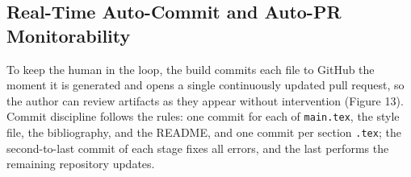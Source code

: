 \subsection{Real-Time Auto-Commit and Auto-PR Monitorability}

To keep the human in the loop, the build commits each file to GitHub the moment it
is generated and opens a single continuously updated pull request, so the author can
review artifacts as they appear without intervention (Figure 13). Commit discipline
follows the rules: one commit for each of \texttt{main.tex}, the style file, the
bibliography, and the README, and one commit per section \texttt{.tex}; the
second-to-last commit of each stage fixes all errors, and the last performs the
remaining repository updates.



